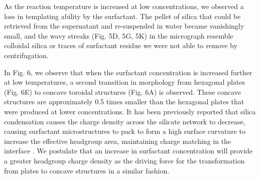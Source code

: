 \documentclass[a4paper,12pt,twocolumn]{article}
\begin{document}
  	 \begin{figure}[h]
  	\noindent%
	\begin{minipage}{\linewidth}%
	\end{minipage}
	\end{figure}	
  	

  	As the reaction temperature is increased at low concentrations, we observed a loss in templating ability by the surfactant. The pellet of silica that could be retrieved from the supernatant and re-suspended in water became vanishingly small, and the wavy streaks (Fig. 5D, 5G, 5K) in the micrograph resemble colloidal silica or traces of surfactant residue we were not able to remove by centrifugation.
  	
  	In Fig. 6, we observe that when the surfactant concentration is increased further at low temperatures, a second transition in morphology from hexagonal plates (Fig. 6E) to concave toroidal structures (Fig. 6A) is observed. These concave structures are approximately 0.5 times smaller than the hexagonal plates that were produced at lower concentrations. It has been previously reported that silica condensation causes the charge density across the silicate network to decrease, causing surfactant microstructures to pack to form a high surface curvature to increase the effective headgroup area, maintaining charge matching in the interface \cite{che2005}. We postulate that an increase in surfactant concentration will provide a greater headgroup charge density as the driving force for the transformation from plates to concave structures in a similar fashion.
  	
\end{document}
